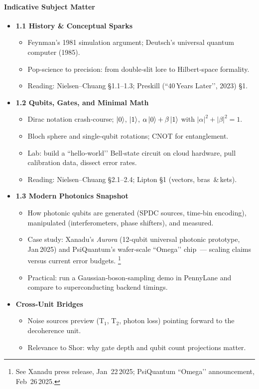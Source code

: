 \documentclass[11pt,a4paper]{article}
\begin{document}
\paragraph{Indicative Subject Matter}
\begin{itemize}
	\item \textbf{1.1 History \& Conceptual Sparks}
	\begin{itemize}
		\item Feynman’s 1981 simulation argument; Deutsch’s universal quantum computer (1985).
		\item Pop‑science to precision: from double‑slit lore to Hilbert‑space formality.
		\item Reading: Nielsen–Chuang §1.1–1.3; Preskill (``40 Years Later’’, 2023) §1.
	\end{itemize}
	\item \textbf{1.2 Qubits, Gates, and Minimal Math}
	\begin{itemize}
		\item Dirac notation crash‑course; $\ket{0}$, $\ket{1}$, $\alpha\ket{0}+\beta\ket{1}$ with $\lvert\alpha\rvert^{2}+\lvert\beta\rvert^{2}=1$.
		\item Bloch sphere and single‑qubit rotations; CNOT for entanglement.
		\item Lab: build a ``hello‑world’’ Bell‑state circuit on cloud hardware, pull calibration data, dissect error rates.
		\item Reading: Nielsen–Chuang §2.1–2.4; Lipton §1 (vectors, bras \& kets).
	\end{itemize}
	\item \textbf{1.3 Modern Photonics Snapshot}
	\begin{itemize}
		\item How photonic qubits are generated (SPDC sources, time‑bin encoding), manipulated (interferometers, phase shifters), and measured.
		\item Case study: Xanadu’s \emph{Aurora} (12‑qubit universal photonic prototype, Jan 2025) and PsiQuantum’s wafer‑scale ``Omega’’ chip — scaling claims versus current error budgets.%
		\footnote{See Xanadu press release, Jan 22 2025; PsiQuantum ``Omega’’ announcement, Feb 26 2025.}
		\item Practical: run a Gaussian‑boson‑sampling demo in PennyLane and compare to superconducting backend timings.
	\end{itemize}
	\item \textbf{Cross‑Unit Bridges}
	\begin{itemize}
		\item Noise sources preview (T$_1$, T$_2$, photon loss) pointing forward to the decoherence unit.
		\item Relevance to Shor: why gate depth and qubit count projections matter.
	\end{itemize}
\end{itemize}
\end{document}
